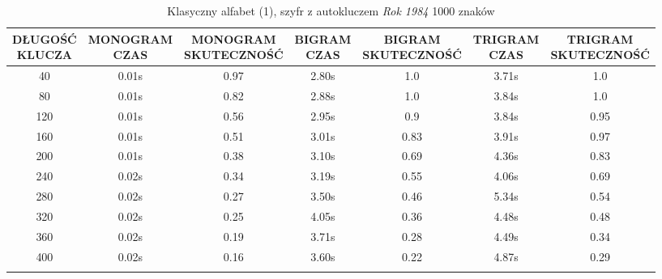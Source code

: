 \documentclass[a4paper]{article}
\theoremstyle{defn}
\theoremstyle{theorem}
\theoremstyle{lemma}
\theoremstyle{cor}
\theoremstyle{fact}
\begin{document}
\begin{center}\begin{small}\begin{longtable}{|c|c|c|c|c|c|c|}
\hline \makecell{DŁUGOŚĆ\\KLUCZA} &  \makecell{MONOGRAM\\CZAS} & \makecell{MONOGRAM\\SKUTECZNOŚĆ} & \makecell{BIGRAM\\CZAS} &  \makecell{BIGRAM\\SKUTECZNOŚĆ} & \makecell{TRIGRAM\\CZAS} & \makecell{TRIGRAM\\SKUTECZNOŚĆ}\\ \hline
40 & 0.01s & 0.97 & 2.80s & 1.0 & 3.71s & 1.0 \\ \hline
80 & 0.01s & 0.82 & 2.88s & 1.0 & 3.84s & 1.0 \\ \hline
120 & 0.01s & 0.56 & 2.95s & 0.9 & 3.84s & 0.95 \\ \hline
160 & 0.01s & 0.51 & 3.01s & 0.83 & 3.91s & 0.97 \\ \hline
200 & 0.01s & 0.38 & 3.10s & 0.69 & 4.36s & 0.83 \\ \hline
240 & 0.02s & 0.34 & 3.19s & 0.55 & 4.06s & 0.69 \\ \hline
280 & 0.02s & 0.27 & 3.50s & 0.46 & 5.34s & 0.54 \\ \hline
320 & 0.02s & 0.25 & 4.05s & 0.36 & 4.48s & 0.48 \\ \hline
360 & 0.02s & 0.19 & 3.71s & 0.28 & 4.49s & 0.34 \\ \hline
400 & 0.02s & 0.16 & 3.60s & 0.22 & 4.87s & 0.29 \\ \hline
\caption{Klasyczny alfabet (1), szyfr z autokluczem \textit{Rok 1984} 1000 znaków}
\end{longtable}\end{small}\end{center}
\end{document}
